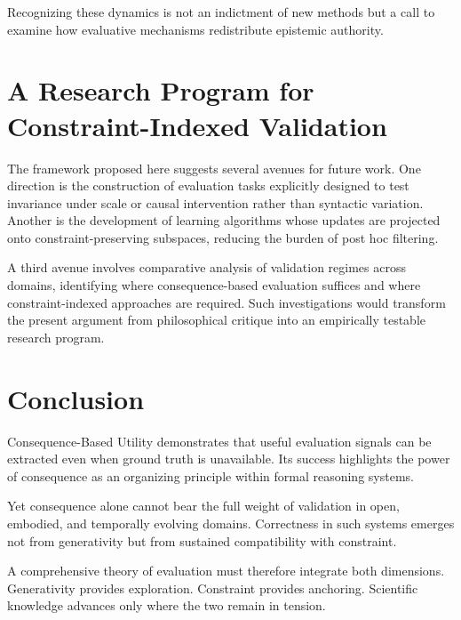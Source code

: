 \documentclass[11pt]{article}
\begin{document}
Recognizing these dynamics is not an indictment of new methods but a call to examine how evaluative mechanisms redistribute epistemic authority.

\section{A Research Program for Constraint-Indexed Validation}

The framework proposed here suggests several avenues for future work. One direction is the construction of evaluation tasks explicitly designed to test invariance under scale or causal intervention rather than syntactic variation. Another is the development of learning algorithms whose updates are projected onto constraint-preserving subspaces, reducing the burden of post hoc filtering.

A third avenue involves comparative analysis of validation regimes across domains, identifying where consequence-based evaluation suffices and where constraint-indexed approaches are required. Such investigations would transform the present argument from philosophical critique into an empirically testable research program.

\section{Conclusion}

Consequence-Based Utility demonstrates that useful evaluation signals can be extracted even when ground truth is unavailable. Its success highlights the power of consequence as an organizing principle within formal reasoning systems.

Yet consequence alone cannot bear the full weight of validation in open, embodied, and temporally evolving domains. Correctness in such systems emerges not from generativity but from sustained compatibility with constraint.

A comprehensive theory of evaluation must therefore integrate both dimensions. Generativity provides exploration. Constraint provides anchoring. Scientific knowledge advances only where the two remain in tension.
\end{document}
